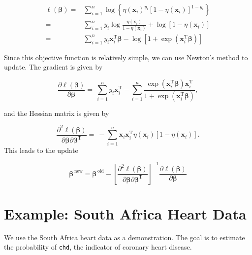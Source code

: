 \documentclass[
]{book}
\theoremstyle{definition}
\theoremstyle{definition}
\theoremstyle{definition}
\theoremstyle{definition}
\theoremstyle{remark}
\begin{document}
\begin{align}
\ell(\boldsymbol \beta) =& \sum_{i=1}^n \log \left\{ \eta(\mathbf{x}_i)^{y_i} [1-\eta(\mathbf{x}_i)]^{1-y_i} \right\}\\
    =& \sum_{i=1}^n y_i \log \frac{\eta(\mathbf{x}_i)}{1-\eta(\mathbf{x}_i)} + \log [1-\eta(\mathbf{x}_i)] \\
    =& \sum_{i=1}^n y_i \mathbf{x}_i^\text{T}\boldsymbol \beta- \log [ 1 + \exp(\mathbf{x}_i^\text{T}\boldsymbol \beta)]
\end{align}

Since this objective function is relatively simple, we can use Newton's method to update. The gradient is given by

\[\frac{\partial \ell(\boldsymbol \beta)}{\partial \boldsymbol \beta} =~ \sum_{i=1}^n y_i \mathbf{x}_i^\text{T}- \sum_{i=1}^n \frac{\exp(\mathbf{x}_i^\text{T}\boldsymbol \beta) \mathbf{x}_i^\text{T}}{1 + \exp(\mathbf{x}_i^\text{T}\boldsymbol \beta)},\]

and the Hessian matrix is given by

\[\frac{\partial^2 \ell(\boldsymbol \beta)}{\partial \boldsymbol \beta\partial \boldsymbol \beta^\text{T}} =~ - \sum_{i=1}^n \mathbf{x}_i \mathbf{x}_i^\text{T}\eta(\mathbf{x}_i) [1- \eta(\mathbf{x}_i)].\]
This leads to the update

\[\boldsymbol \beta^{\,\text{new}} = \boldsymbol \beta^{\,\text{old}} - \left[\frac{\partial^2 \ell(\boldsymbol \beta)}{\partial \boldsymbol \beta\partial \boldsymbol \beta^\text{T}}\right]^{-1} \frac{\partial \ell(\boldsymbol \beta)}{\partial \boldsymbol \beta}\]

\hypertarget{example-south-africa-heart-data}{%
\section{Example: South Africa Heart Data}\label{example-south-africa-heart-data}}

We use the South Africa heart data as a demonstration. The goal is to estimate the probability of \texttt{chd}, the indicator of coronary heart disease.
\end{document}
